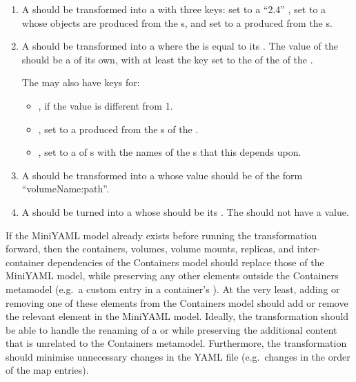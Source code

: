 \documentclass[sigconf,review]{acmart}
\begin{document}
\begin{enumerate}
\item A  should be transformed into a 
  with three keys:  set to a ``2.4'' ,
   set to a  whose  objects
  are produced from the s, and  set to a
   produced from the s.

\item A  should be transformed into a 
  where the  is equal to its . The value of the
   should be a  of its own, with at least the
   key set to the  of the  of the
  .

  The  may also have keys for:
  \begin{itemize}
  \item {}, if the value is different from 1.
  \item {}, set to a  produced from the
    s of the .
  \item {}, set to a  of s
    with the names of the s that this 
    depends upon.
  \end{itemize}

\item A  should be transformed into a 
  whose value should be of the form ``volumeName:path''.

\item A  should be turned into a  whose
   should be its . The  should
  not have a value.
\end{enumerate}

If the MiniYAML model already exists before running the transformation forward,
then the containers, volumes, volume mounts, replicas, and inter-container
dependencies of the Containers model should replace those of the MiniYAML model,
while preserving any other elements outside the Containers metamodel (e.g.\ a
custom  entry in a container's ). At the very
least, adding or removing one of these elements from the Containers model should
add or remove the relevant element in the MiniYAML model. Ideally, the
transformation should be able to handle the renaming of a 
or  while preserving the additional content that is unrelated
to the Containers metamodel. Furthermore, the transformation should minimise
unnecessary changes in the YAML file (e.g.\ changes in the order of the map
entries).
\end{document}
